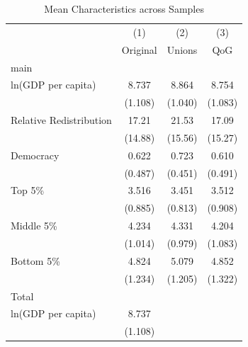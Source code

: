 \begin{table}[htbp]\centering
\def\sym#1{\ifmmode^{#1}\else\(^{#1}\)\fi}
\caption{Mean Characteristics across Samples}
\begin{tabular}{l*{3}{c}}
\toprule
                    &\multicolumn{1}{c}{(1)}&\multicolumn{1}{c}{(2)}&\multicolumn{1}{c}{(3)}\\
                    &\multicolumn{1}{c}{Original}&\multicolumn{1}{c}{Unions}&\multicolumn{1}{c}{QoG}\\
\midrule
main                &                     &                     &                     \\
ln(GDP per capita)  &       8.737         &       8.864         &       8.754         \\
                    &     (1.108)         &     (1.040)         &     (1.083)         \\
\addlinespace
Relative Redistribution&       17.21         &       21.53         &       17.09         \\
                    &     (14.88)         &     (15.56)         &     (15.27)         \\
\addlinespace
Democracy           &       0.622         &       0.723         &       0.610         \\
                    &     (0.487)         &     (0.451)         &     (0.491)         \\
\addlinespace
Top 5\%             &       3.516         &       3.451         &       3.512         \\
                    &     (0.885)         &     (0.813)         &     (0.908)         \\
\addlinespace
Middle 5\%          &       4.234         &       4.331         &       4.204         \\
                    &     (1.014)         &     (0.979)         &     (1.083)         \\
\addlinespace
Bottom 5\%          &       4.824         &       5.079         &       4.852         \\
                    &     (1.234)         &     (1.205)         &     (1.322)         \\
\midrule
Total               &                     &                     &                     \\
ln(GDP per capita)  &       8.737         &                     &                     \\
                    &     (1.108)         &                     &                     \\

\end{tabular}
\end{table}
